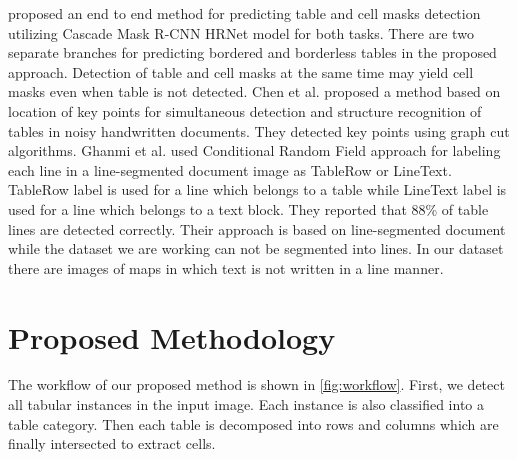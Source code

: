 \cite{prasad2020cascadetabnet} proposed an end to end method for predicting table and cell masks detection utilizing Cascade Mask R-CNN HRNet model for both tasks. There are two separate branches for predicting bordered and borderless tables in the proposed approach. Detection of table and cell masks at the same time may yield cell masks even when table is not detected. Chen et al. \cite{chen2012model} proposed a method based on location of key points for simultaneous detection and structure recognition of tables in noisy handwritten documents. They detected key points using graph cut algorithms. Ghanmi et al. \cite{ghanmi2014table} used Conditional Random Field approach for labeling each line in a line-segmented document image as TableRow or LineText. TableRow label is used for a line which belongs to a table while LineText label is used for a line which belongs to a text block. They reported that 88\% of table lines are detected correctly. Their approach is based on line-segmented document while the dataset we are working can not be segmented into lines. In our dataset there are images of maps in which text is not written in a line manner.

\section{Proposed Methodology}
\label{proposedMethodolgy}
The workflow of our proposed method is shown in \autoref{fig:workflow}. First, we detect all tabular instances in the input image. Each instance is also classified into a table category. Then each table is decomposed  into  rows  and  columns  which  are  finally  intersected to extract cells.

